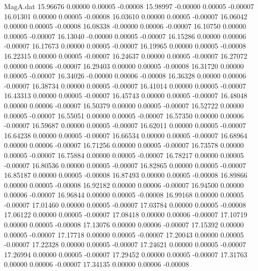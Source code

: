\begin{filecontents}{MagA.dat}
  15.96676    0.00000    0.00005   -0.00008
  15.98997   -0.00000    0.00005   -0.00007
  16.01301    0.00000    0.00005   -0.00008
  16.03610    0.00000    0.00005   -0.00007
  16.06042    0.00000    0.00005   -0.00008
  16.08338   -0.00000    0.00006   -0.00007
  16.10750    0.00000    0.00005   -0.00007
  16.13040   -0.00000    0.00005   -0.00007
  16.15286    0.00000    0.00006   -0.00007
  16.17673    0.00000    0.00005   -0.00007
  16.19965    0.00000    0.00005   -0.00008
  16.22315    0.00000    0.00005   -0.00007
  16.24637    0.00000    0.00005   -0.00007
  16.27072    0.00000    0.00006   -0.00007
  16.29403    0.00000    0.00005   -0.00008
  16.31720    0.00000    0.00005   -0.00007
  16.34026   -0.00000    0.00006   -0.00008
  16.36328    0.00000    0.00006   -0.00007
  16.38734    0.00000    0.00005   -0.00007
  16.41014    0.00000    0.00005   -0.00007
  16.43313    0.00000    0.00005   -0.00007
  16.45743    0.00000    0.00005   -0.00007
  16.48048    0.00000    0.00006   -0.00007
  16.50379    0.00000    0.00005   -0.00007
  16.52722    0.00000    0.00005   -0.00007
  16.55051    0.00000    0.00005   -0.00007
  16.57350    0.00000    0.00006   -0.00007
  16.59687    0.00000    0.00005   -0.00007
  16.62011    0.00000    0.00005   -0.00007
  16.64238    0.00000    0.00005   -0.00007
  16.66534    0.00000    0.00005   -0.00007
  16.68964    0.00000    0.00006   -0.00007
  16.71256    0.00000    0.00005   -0.00007
  16.73578    0.00000    0.00005   -0.00007
  16.75884    0.00000    0.00005   -0.00007
  16.78217    0.00000    0.00005   -0.00007
  16.80536    0.00000    0.00005   -0.00007
  16.82865    0.00000    0.00005   -0.00007
  16.85187    0.00000    0.00005   -0.00008
  16.87493    0.00000    0.00005   -0.00008
  16.89866    0.00000    0.00005   -0.00008
  16.92182    0.00000    0.00006   -0.00007
  16.94500    0.00000    0.00006   -0.00007
  16.96844    0.00000    0.00005   -0.00008
  16.99168    0.00000    0.00005   -0.00007
  17.01460    0.00000    0.00005   -0.00007
  17.03784    0.00000    0.00005   -0.00008
  17.06122    0.00000    0.00005   -0.00007
  17.08418    0.00000    0.00006   -0.00007
  17.10719    0.00000    0.00005   -0.00008
  17.13076    0.00000    0.00006   -0.00007
  17.15392    0.00000    0.00005   -0.00007
  17.17718    0.00000    0.00005   -0.00007
  17.20043    0.00000    0.00005   -0.00007
  17.22328    0.00000    0.00005   -0.00007
  17.24621    0.00000    0.00005   -0.00007
  17.26994    0.00000    0.00005   -0.00007
  17.29452    0.00000    0.00005   -0.00007
  17.31763    0.00000    0.00006   -0.00007
  17.34135    0.00000    0.00006   -0.00008

\end{filecontents}
